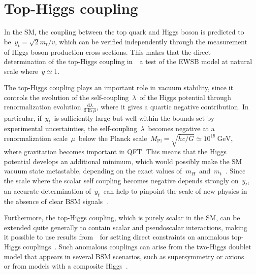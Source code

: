 \section{Top-Higgs coupling}
In the SM, the coupling between the top quark and Higgs boson is predicted to be~$y_t = \sqrt{2} m_t / v$, which can be verified independently through the measurement of Higgs boson production cross sections. This makes that the direct determination of the top-Higgs coupling in~\ttH~a test of the EWSB model at natural scale where~$y \simeq 1$.  

The top-Higgs coupling plays an important role in vacuum stability, since it controls the evolution of the self-coupling~$\lambda$~of the Higgs potential through renormalization evolution $\frac{\mathrm{d}\lambda}{\mathrm{d}\ln{\mu}}$, where it gives a quartic negative contribution. In particular, if~$y_t$~is sufficiently large but well within the bounds set by experimental uncertainties, the self-coupling~$\lambda$~becomes negative at a renormalization scale~$\mu$~below the Planck scale~$M_{\mathrm{Pl}} = \sqrt{\bar{h}c / G} \simeq 10^{19}~\mathrm{GeV}$, where gravitation becomes important in QFT. This means that the Higgs potential develops an additional minimum, which would possibly make the SM vacuum state metastable, depending on the exact values of~$m_H$~and~$m_t$~\cite{Degrassi:2012ry}. Since the scale where the scalar self coupling becomes negative depends strongly on~$y_t$, an accurate determination of~$y_t$~can help to pinpoint the scale of new physics in the absence of clear BSM signals~\cite{Bezrukov:2014ina}.

Furthermore, the top-Higgs coupling, which is purely scalar in the SM, can be extended quite generally to contain scalar and pseudoscalar interactions, making it possible to use results from~\ttH~for setting direct constraints on anomalous top-Higgs couplings~\cite{Kobakhidze:2016mfx}. Such anomalous couplings can arise from the two-Higgs doublet model that appears in several BSM scenarios, such as supersymmetry or axions~\cite{Branco:2011iw} or from models with a composite Higgs~\cite{Liu:2017dsz}.